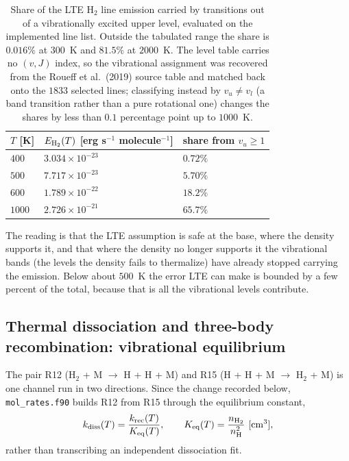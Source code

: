 \documentclass[english,a4paper]{my_memo}
\begin{document}
\begin{table}[h]
\centering
\begin{tabular}{@{}lll@{}}
\toprule
$T$ [K] & $E_{\rm H_2}(T)$ [erg s$^{-1}$ molecule$^{-1}$]
        & share from $v_u \geq 1$ \\
\midrule
$400$  & $3.034\times10^{-23}$ & $0.72\%$ \\
$500$  & $7.717\times10^{-23}$ & $5.70\%$ \\
$600$  & $1.789\times10^{-22}$ & $18.2\%$ \\
$1000$ & $2.726\times10^{-21}$ & $65.7\%$ \\
\bottomrule
\end{tabular}
\caption{Share of the LTE H$_2$ line emission carried by transitions out of a
vibrationally excited upper level, evaluated on the implemented line list.
Outside the tabulated range the share is $0.016\%$ at $300$~K and $81.5\%$ at
$2000$~K. The level table carries no $(v,J)$ index, so the vibrational
assignment was recovered from the Roueff et al.\ (2019) source table and
matched back onto the $1833$ selected lines; classifying instead by
$v_u \neq v_l$ (a band transition rather than a pure rotational one) changes
the shares by less than $0.1$ percentage point up to $1000$~K.}
\label{tab:vibshare}
\end{table}

The reading is that the LTE assumption is safe at the base, where the density
supports it, and that where the density no longer supports it the vibrational
bands (the levels the density fails to thermalize) have already stopped
carrying the emission. Below about $500$~K the error LTE can make is bounded
by a few percent of the total, because that is all the vibrational levels
contribute.

\subsection{Thermal dissociation and three-body recombination: vibrational
equilibrium}
\label{sec:diss}

The pair R12 (H$_2$ + M $\rightarrow$ H + H + M) and R15 (H + H + M
$\rightarrow$ H$_2$ + M) is one channel run in two directions. Since the
change recorded below, \texttt{mol\_rates.f90} builds R12 from R15 through the
equilibrium constant,
%
\begin{equation}
  k_{\rm diss}(T) = \frac{k_{\rm rec}(T)}{K_{\rm eq}(T)},
  \qquad
  K_{\rm eq}(T) = \frac{n_{\rm H_2}}{n_{\rm H}^2}\ [\mathrm{cm^3}],
\end{equation}
%
rather than transcribing an independent dissociation fit.
\end{document}
